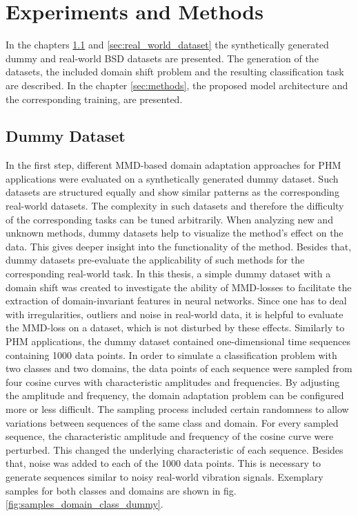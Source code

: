 \chapter{Experiments and Methods}\label{sec:experiments}
In the chapters \ref{sec:dummy_dataset} and \ref{sec:real_world_dataset} the synthetically generated dummy and real-world BSD datasets are presented. The generation of the datasets, the included domain shift problem and the resulting classification task are described. In the chapter \ref{sec:methods}, the proposed model architecture and the corresponding training, are presented. 
\section{Dummy Dataset}\label{sec:dummy_dataset}
In the first step, different MMD-based domain adaptation approaches for PHM applications were evaluated on a synthetically generated dummy dataset. Such datasets are structured equally and show similar patterns as the corresponding real-world datasets. The complexity in such datasets and therefore the difficulty of the corresponding tasks can be tuned arbitrarily. When analyzing new and unknown methods, dummy datasets help to visualize the method's effect on the data. This gives deeper insight into the functionality of the method. Besides that, dummy datasets pre-evaluate the applicability of such methods for the corresponding real-world task. In this thesis, a simple dummy dataset with a domain shift was created to investigate the ability of MMD-losses to facilitate the extraction of domain-invariant features in neural networks. Since one has to deal with irregularities, outliers and noise in real-world data, it is helpful to evaluate the MMD-loss on a dataset, which is not disturbed by these effects. Similarly to PHM applications, the dummy dataset contained one-dimensional time sequences containing 1000 data points. In order to simulate a classification problem with two classes and two domains, the data points of each sequence were sampled from four cosine curves with characteristic amplitudes and frequencies. By adjusting the amplitude and frequency, the domain adaptation problem can be configured more or less difficult. The sampling process included certain randomness to allow variations between sequences of the same class and domain. For every sampled sequence, the characteristic amplitude and frequency of the cosine curve were perturbed. This changed the underlying characteristic of each sequence. Besides that, noise was added to each of the 1000 data points. This is necessary to generate sequences similar to noisy real-world vibration signals. Exemplary samples for both classes and domains are shown in fig. \ref{fig:samples_domain_class_dummy}.

